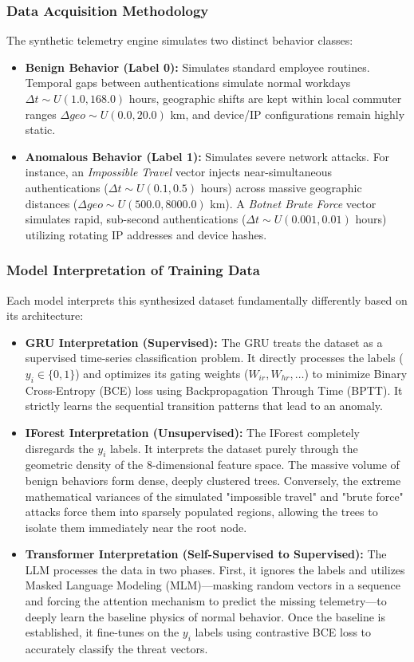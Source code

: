 \documentclass[pdflatex,sn-mathphys-num]{sn-jnl}
\theoremstyle{thmstyleone}%
\theoremstyle{thmstyletwo}%
\theoremstyle{thmstylethree}%
\begin{document}
\subsubsection{Data Acquisition Methodology}
The synthetic telemetry engine simulates two distinct behavior classes:
\begin{itemize}
    \item \textbf{Benign Behavior (Label 0):} Simulates standard employee routines. Temporal gaps between authentications simulate normal workdays $\Delta t \sim U(1.0, 168.0)$ hours, geographic shifts are kept within local commuter ranges $\Delta geo \sim U(0.0, 20.0)$ km, and device/IP configurations remain highly static.
    \item \textbf{Anomalous Behavior (Label 1):} Simulates severe network attacks. For instance, an \textit{Impossible Travel} vector injects near-simultaneous authentications ($\Delta t \sim U(0.1, 0.5)$ hours) across massive geographic distances ($\Delta geo \sim U(500.0, 8000.0)$ km). A \textit{Botnet Brute Force} vector simulates rapid, sub-second authentications ($\Delta t \sim U(0.001, 0.01)$ hours) utilizing rotating IP addresses and device hashes.
\end{itemize}

\subsubsection{Model Interpretation of Training Data}
Each model interprets this synthesized dataset fundamentally differently based on its architecture:
\begin{itemize}
    \item \textbf{GRU Interpretation (Supervised):} The GRU treats the dataset as a supervised time-series classification problem. It directly processes the labels ($y_i \in \{0, 1\}$) and optimizes its gating weights ($W_{ir}, W_{hr}, \dots$) to minimize Binary Cross-Entropy (BCE) loss using Backpropagation Through Time (BPTT). It strictly learns the sequential transition patterns that lead to an anomaly.
    \item \textbf{IForest Interpretation (Unsupervised):} The IForest completely disregards the $y_i$ labels. It interprets the dataset purely through the geometric density of the 8-dimensional feature space. The massive volume of benign behaviors form dense, deeply clustered trees. Conversely, the extreme mathematical variances of the simulated "impossible travel" and "brute force" attacks force them into sparsely populated regions, allowing the trees to isolate them immediately near the root node.
    \item \textbf{Transformer Interpretation (Self-Supervised to Supervised):} The LLM processes the data in two phases. First, it ignores the labels and utilizes Masked Language Modeling (MLM)—masking random vectors in a sequence and forcing the attention mechanism to predict the missing telemetry—to deeply learn the baseline physics of normal behavior. Once the baseline is established, it fine-tunes on the $y_i$ labels using contrastive BCE loss to accurately classify the threat vectors.
\end{itemize}
\end{document}

